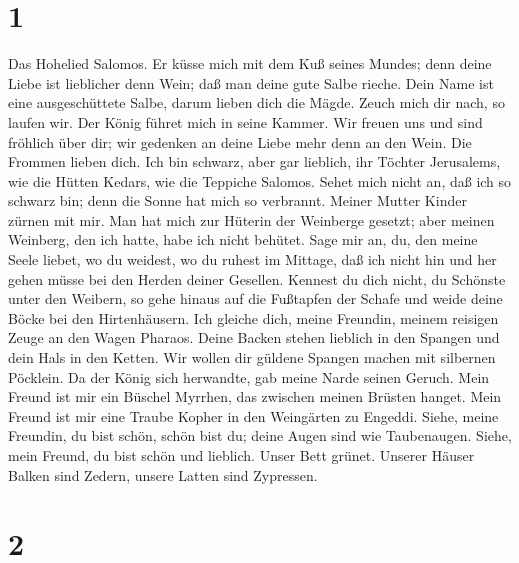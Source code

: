 \hypertarget{section}{%
\section{1}\label{section}}

 Das Hohelied Salomos.  Er küsse mich mit dem
Kuß seines Mundes; denn deine Liebe ist lieblicher denn Wein;
 daß man deine gute Salbe rieche. Dein Name ist eine
ausgeschüttete Salbe, darum lieben dich die Mägde.  Zeuch
mich dir nach, so laufen wir. Der König führet mich in seine Kammer. Wir
freuen uns und sind fröhlich über dir; wir gedenken an deine Liebe mehr
denn an den Wein. Die Frommen lieben dich.  Ich bin schwarz,
aber gar lieblich, ihr Töchter Jerusalems, wie die Hütten Kedars, wie
die Teppiche Salomos.  Sehet mich nicht an, daß ich so
schwarz bin; denn die Sonne hat mich so verbrannt. Meiner Mutter Kinder
zürnen mit mir. Man hat mich zur Hüterin der Weinberge gesetzt; aber
meinen Weinberg, den ich hatte, habe ich nicht behütet. 
Sage mir an, du, den meine Seele liebet, wo du weidest, wo du ruhest im
Mittage, daß ich nicht hin und her gehen müsse bei den Herden deiner
Gesellen.  Kennest du dich nicht, du Schönste unter den
Weibern, so gehe hinaus auf die Fußtapfen der Schafe und weide deine
Böcke bei den Hirtenhäusern.  Ich gleiche dich, meine
Freundin, meinem reisigen Zeuge an den Wagen Pharaos. 
Deine Backen stehen lieblich in den Spangen und dein Hals in den Ketten.
 Wir wollen dir güldene Spangen machen mit silbernen
Pöcklein.  Da der König sich herwandte, gab meine Narde
seinen Geruch.  Mein Freund ist mir ein Büschel Myrrhen,
das zwischen meinen Brüsten hanget.  Mein Freund ist mir
eine Traube Kopher in den Weingärten zu Engeddi.  Siehe,
meine Freundin, du bist schön, schön bist du; deine Augen sind wie
Taubenaugen.  Siehe, mein Freund, du bist schön und
lieblich. Unser Bett grünet.  Unserer Häuser Balken sind
Zedern, unsere Latten sind Zypressen.

\hypertarget{section-1}{%
\section{2}\label{section-1}}

